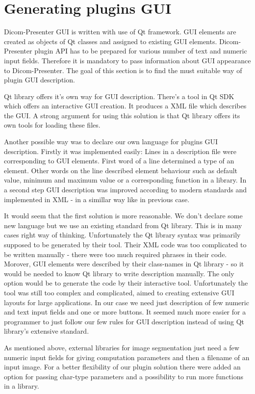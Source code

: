 \section{Generating plugins GUI}

Dicom-Presenter GUI is written with use of Qt framework. GUI elements are created as objects of Qt classes and assigned to existing GUI elements. Dicom-Presenter plugin API has to be prepared for various number of text and numeric input fields. Therefore it is mandatory to pass information about GUI appearance to Dicom-Presenter. The goal of this section is to find the must suitable way of plugin GUI description.

Qt library offers it's own way for GUI description. There's a tool in Qt SDK which offers an interactive GUI creation. It produces a XML file which describes the GUI. A strong argument for using this solution is that Qt library offers its own tools for loading these files.

Another possible way was to declare our own language for plugins GUI description. Firstly it was implemented easily: Lines in a description file were corresponding to GUI elements. First word of a line determined a type of an element. Other words on the line described element behaviour such as default value, minimum and maximum value or a corresponding function in a library. In a second step GUI description was improved according to modern standards and implemented in XML - in a simillar way like in previous case.

It would seem that the first solution is more reasonable. We don't declare some new language but we use an existing standard from Qt library. This is in many cases right way of thinking. Unfortunately the Qt library syntax was primarily supposed to be generated by their tool. Their XML code was too complicated to be written manually - there were too much required phrases in their code. Morover, GUI elements were described by their class-names in Qt library - so it would be needed to know Qt library to write description manually. The only option would be to generate the code by their interactive tool. Unfortunately the tool was still too complex and complicated, aimed to creating extensive GUI layouts for large applications. In our case we need just description of few numeric and text input fields and one or more buttons. It seemed much more easier for a programmer to just follow our few rules for GUI description instead of using Qt library's extensive standard.

As mentioned above, external libraries for image segmentation just need a few numeric input fields for giving computation parameters and then a filename of an input image. For a better flexibility of our plugin solution there were added an option for passing char-type parameters and a possibility to run more functions in a library.

